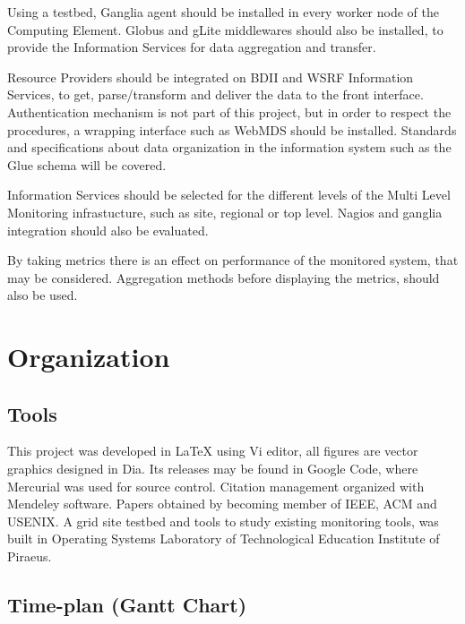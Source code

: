 Using a testbed, Ganglia agent should be installed in every worker node of the Computing Element. Globus and gLite middlewares should also be installed, to provide the Information Services for data aggregation and transfer.

Resource Providers should be integrated on \ac{BDII} and \ac{WSRF} Information Services, to get, parse/transform and deliver the data to the front interface. Authentication mechanism is not part of this project, but in order to respect the procedures, a wrapping interface such as WebMDS should be installed. Standards and specifications about data organization in the information system such as the Glue schema will be covered.

Information Services should be selected for the different levels of the Multi Level Monitoring infrastucture, such as site, regional or top level. Nagios and ganglia integration should also be evaluated.

By taking metrics there is an effect on performance of the monitored system, that may be considered. Aggregation methods before displaying the metrics, should also be used.

\section{Organization}

\subsection[Tools]{Tools}
This project was developed in \LaTeX{} using Vi editor, all figures are vector graphics designed in Dia. Its releases may be found in Google Code, where Mercurial was used for source control. Citation management organized with Mendeley software. Papers obtained by becoming member of IEEE, ACM and USENIX. A grid site testbed and tools to study existing monitoring tools, was built in Operating Systems Laboratory of Technological Education Institute of Piraeus.

\subsection[Time plan]{Time-plan (Gantt Chart)}

